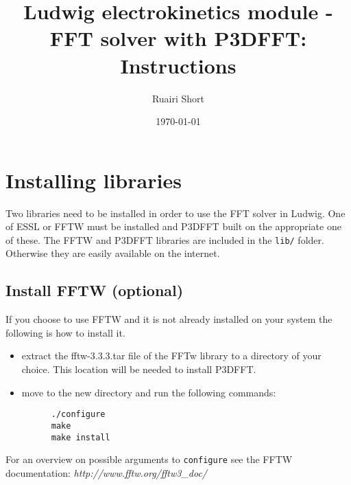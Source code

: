 \documentclass[12pt,a4paper]{article}
\begin{document}


\setcounter{secnumdepth}{3}



\title{Ludwig electrokinetics module - FFT solver with P3DFFT:\\ Instructions}
\author{Ruairi Short}
\date{\today}

\maketitle

\tableofcontents
\clearpage



\section{Installing libraries}
Two libraries need to be installed in order to use the FFT solver in Ludwig.
One of ESSL or FFTW must be installed and P3DFFT built on the appropriate one of these.
The FFTW and P3DFFT libraries are included in the \texttt{lib/} folder.
Otherwise they are easily available on the internet.

\subsection{Install FFTW (optional)}
If you choose to use FFTW and it is not already installed on your system the following is how to install it.
  \begin{itemize}
  \item extract the fftw-3.3.3.tar file of the FFTw library to a directory of your choice. This location will be needed to install P3DFFT.
  \item move to the new directory and run the following commands:
    \begin{verbatim}
      ./configure
      make
      make install
    \end{verbatim}
  \end{itemize}

For an overview on possible arguments to \texttt{configure} see the FFTW documentation: \textit{http://www.fftw.org/fftw3\_doc/}
\end{document}
